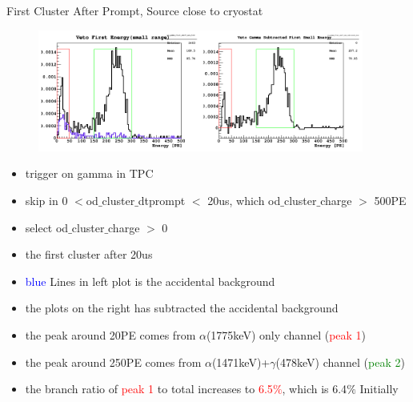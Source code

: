 \documentclass[9pt]{beamer}
\begin{document}
\begin{frame}{First Cluster After Prompt, Source close to cryostat}
\begin{figure}
\includegraphics[height= 4cm, width=\textwidth]{nv_gamma_first_small_ene_subtracted_Feb7PM.png}
\end{figure}
\begin{itemize}
[bullet]
\item trigger on gamma in TPC
\item skip in 0 $<$od$\_$cluster$\_$dtprompt $<$ 20us, which od$\_$cluster$\_$charge $>$ 500PE
\item select od$\_$cluster$\_$charge $>$ 0
\item the first cluster after 20us
\item \textcolor{blue}{blue} Lines in left plot is the accidental background 
\item the plots on the right has subtracted the accidental background 
\item the peak around 20PE comes from $\alpha$(1775keV) only channel (\textcolor{red}{peak 1})
\item the peak around 250PE comes from $\alpha$(1471keV)+$\gamma$(478keV) channel (\textcolor{green}{peak 2})
\item the branch ratio of \textcolor{red}{peak 1} to total increases to \textcolor{red}{6.5$\%$}, which is 6.4$\%$ Initially 
\end{itemize}
\end{frame}
\end{document}
